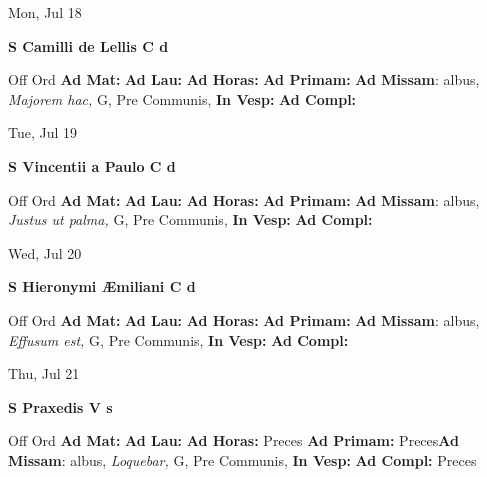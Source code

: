 \documentclass[10pt]{book}
\begin{document}
\begin{center}
\begin{minipage}{3.5in}
\vspace{2em}
\begin{center}Mon, Jul 18
\end{center}
\textbf{ \large S Camilli de Lellis C
\textnormal{\normalsize d}}

\begin{justify}Off Ord
\textbf{Ad Mat: }
\textbf{Ad Lau: }
\textbf{Ad Horas: }
\textbf{Ad Primam: }\textbf{Ad Missam}: albus, \textit{Majorem hac,} G, Pre Communis, 
\textbf{In Vesp: }
\textbf{Ad Compl: }
\end{justify}
\end{minipage}
\end{center}

\begin{center}
\begin{minipage}{3.5in}
\vspace{2em}
\begin{center}Tue, Jul 19
\end{center}
\textbf{ \large S Vincentii a Paulo C
\textnormal{\normalsize d}}

\begin{justify}Off Ord
\textbf{Ad Mat: }
\textbf{Ad Lau: }
\textbf{Ad Horas: }
\textbf{Ad Primam: }\textbf{Ad Missam}: albus, \textit{Justus ut palma,} G, Pre Communis, 
\textbf{In Vesp: }
\textbf{Ad Compl: }
\end{justify}
\end{minipage}
\end{center}

\begin{center}
\begin{minipage}{3.5in}
\vspace{2em}
\begin{center}Wed, Jul 20
\end{center}
\textbf{ \large S Hieronymi Æmiliani C
\textnormal{\normalsize d}}

\begin{justify}Off Ord
\textbf{Ad Mat: }
\textbf{Ad Lau: }
\textbf{Ad Horas: }
\textbf{Ad Primam: }\textbf{Ad Missam}: albus, \textit{Effusum est,} G, Pre Communis, 
\textbf{In Vesp: }
\textbf{Ad Compl: }
\end{justify}
\end{minipage}
\end{center}

\begin{center}
\begin{minipage}{3.5in}
\vspace{2em}
\begin{center}Thu, Jul 21
\end{center}
\textbf{ \large S Praxedis V
\textnormal{\normalsize s}}

\begin{justify}Off Ord
\textbf{Ad Mat: }
\textbf{Ad Lau: }
\textbf{Ad Horas: }Preces
\textbf{Ad Primam: }Preces\textbf{Ad Missam}: albus, \textit{Loquebar,} G, Pre Communis, 
\textbf{In Vesp: }
\textbf{Ad Compl: }Preces
\end{justify}
\end{minipage}
\end{center}
\end{document}
